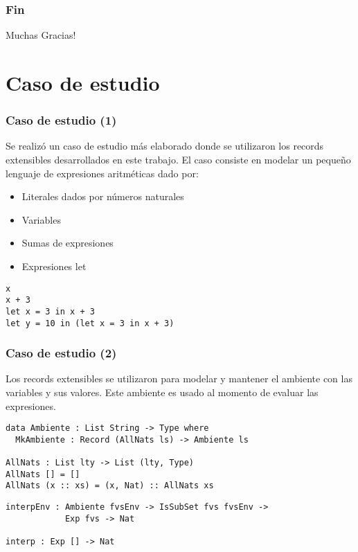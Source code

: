 \documentclass{beamer}
\begin{document}
\begin{frame}
\frametitle{Fin}

\begin{center}
{\huge Muchas Gracias!}
\end{center}

\end{frame}

\section{Caso de estudio}

\begin{frame}[fragile]
\frametitle{Caso de estudio (1)}

Se realizó un caso de estudio más elaborado donde se utilizaron los records extensibles desarrollados en este trabajo. El caso consiste en modelar un pequeño lenguaje de expresiones aritméticas dado por:

\begin{itemize}
\item Literales dados por números naturales
\item Variables
\item Sumas de expresiones
\item Expresiones let
\end{itemize}

\begin{example}
\begin{verbatim}
x
x + 3
let x = 3 in x + 3
let y = 10 in (let x = 3 in x + 3)
\end{verbatim}
\end{example}
\end{frame}

\begin{frame}[fragile]
\frametitle{Caso de estudio (2)}

Los records extensibles se utilizaron para modelar y mantener el ambiente con las variables y sus valores. Este ambiente es usado al momento de evaluar las expresiones.

\pause

\begin{definition}
\begin{verbatim}
data Ambiente : List String -> Type where
  MkAmbiente : Record (AllNats ls) -> Ambiente ls

AllNats : List lty -> List (lty, Type)
AllNats [] = []
AllNats (x :: xs) = (x, Nat) :: AllNats xs
\end{verbatim}
\end{definition}

\begin{definition}
\begin{verbatim}
interpEnv : Ambiente fvsEnv -> IsSubSet fvs fvsEnv -> 
            Exp fvs -> Nat

interp : Exp [] -> Nat
\end{verbatim}
\end{definition}
\end{frame}
\end{document}
